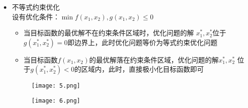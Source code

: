 \documentclass[12pt]{scrartcl}
\begin{document}
{\begin{enumerate}
\begin{enumerate}
\begin{itemize}
            在代表约束条件的绿线与蓝色等高线相切的情况下，它们的切线相同，法向量相互平行，于是有$\lambda$:
            \begin{equation}
                f_{x_1}(x_1,x_2)+\lambda h_{x_1}(x_1,x_2)=0 \notag
            \end{equation}
            \begin{equation}
                f_{x_2}(x_1,x_2)+\lambda h_{x_2}(x_1,x_2)=0 \notag
            \end{equation}
            与拉格朗日乘数法的方程相同。\\
            \item 不等式约束优化\\
            设有优化条件：$\min f(x_1,x_2),g(x_1,x_2)\leqslant0$
            \begin{itemize}
                \item 当目标函数的最优解不在约束条件区域时，优化问题的解
                $x_1^*,x_2^*$位于$g(x_1^*,x_2^*)=0$即边界上，此时优化问题等价为等式约束优化问题
                \item 当目标函数$f(x_1,x_2)$的最优解落在约束条件区域，优化问题的解$x_1^*,x_2^*$ 
                位于$g(x_1^*,x_2^*)<0$的区域内，此时，直接极小化目标函数即可
            \end{itemize}
            \begin{figure}[H]
                \centering
                \texttt{[image: 5.png]}
                \end{figure}
            \begin{figure}[H]
                \centering
                \texttt{[image: 6.png]}
                \end{figure}
        \end{itemize}
        

\end{enumerate}
\end{enumerate}}
\end{document}
